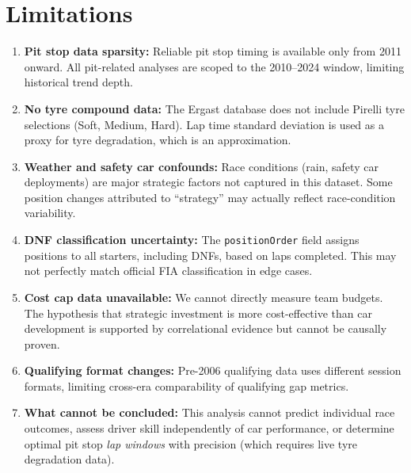 \documentclass[12pt, a4paper]{article}
\begin{document}
\section{Limitations}

\begin{enumerate}
    \item \textbf{Pit stop data sparsity:} Reliable pit stop timing is available only from 2011 onward. All pit-related analyses are scoped to the 2010--2024 window, limiting historical trend depth.

    \item \textbf{No tyre compound data:} The Ergast database does not include Pirelli tyre selections (Soft, Medium, Hard). Lap time standard deviation is used as a proxy for tyre degradation, which is an approximation.

    \item \textbf{Weather and safety car confounds:} Race conditions (rain, safety car deployments) are major strategic factors not captured in this dataset. Some position changes attributed to ``strategy'' may actually reflect race-condition variability.

    \item \textbf{DNF classification uncertainty:} The \texttt{positionOrder} field assigns positions to all starters, including DNFs, based on laps completed. This may not perfectly match official FIA classification in edge cases.

    \item \textbf{Cost cap data unavailable:} We cannot directly measure team budgets. The hypothesis that strategic investment is more cost-effective than car development is supported by correlational evidence but cannot be causally proven.

    \item \textbf{Qualifying format changes:} Pre-2006 qualifying data uses different session formats, limiting cross-era comparability of qualifying gap metrics.

    \item \textbf{What cannot be concluded:} This analysis cannot predict individual race outcomes, assess driver skill independently of car performance, or determine optimal pit stop \textit{lap windows} with precision (which requires live tyre degradation data).
\end{enumerate}

\end{document}
